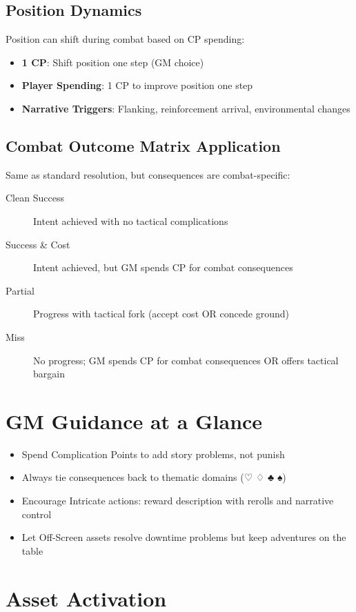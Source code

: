 \subsection*{Position Dynamics}
Position can shift during combat based on CP spending:
\begin{itemize}
  \item \textbf{1 CP}: Shift position one step (GM choice)
  \item \textbf{Player Spending}: 1 CP to improve position one step
  \item \textbf{Narrative Triggers}: Flanking, reinforcement arrival, environmental changes
\end{itemize}

\subsection*{Combat Outcome Matrix Application}
Same as standard resolution, but consequences are combat-specific:
\begin{description}
  \item[Clean Success] Intent achieved with no tactical complications
  \item[Success \& Cost] Intent achieved, but GM spends CP for combat consequences
  \item[Partial] Progress with tactical fork (accept cost OR concede ground)
  \item[Miss] No progress; GM spends CP for combat consequences OR offers tactical bargain
\end{description}

\section{GM Guidance at a Glance}

\begin{itemize}
  \item Spend Complication Points to add story problems, not punish
  \item Always tie consequences back to thematic domains (♡ ♢ ♣ ♠)
  \item Encourage Intricate actions: reward description with rerolls and narrative control
  \item Let Off-Screen assets resolve downtime problems but keep adventures on the table
\end{itemize}

\section{Asset Activation}

